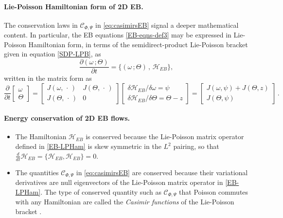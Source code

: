 \documentclass[11pt, oneside]{article}   	%
\numberwithin{equation}{section}
\theoremstyle{plain}
\theoremstyle{definition}
\theoremstyle{remark}
\newcommand{\<}{\langle}
\renewcommand{\>}{\rangle}
\newcommand{\mc}[1]{\mathcal{#1}}
\begin{document}
\paragraph{Lie-Poisson Hamiltonian form of 2D EB.}
The conservation laws in $\mc{C}_{\Phi,\Psi}$ in \eqref{eq:casimirsEB} signal a deeper mathematical content. In particular, the EB equations \eqref{EB-eqns-def3} may be expressed in Lie-Poisson Hamiltonian form, in terms of the semidirect-product Lie-Poisson bracket given in equation \eqref{SDP-LPB}, as
\begin{equation}
 \frac{\partial (\omega \,; \Theta)}{\partial t}  = \big\{(\omega \,;  \Theta)\,,\, \mc{H}_{EB}\big\},
\label{short-note}
\end{equation}
written in the matrix form as
\begin{equation}
 \frac{\partial }{\partial t} 
\begin{bmatrix}
\omega \\ \Theta
\end{bmatrix}
=
\begin{bmatrix}
J(\omega,\,\cdot\,) & J(\Theta,\,\cdot\,) 
\\ 
J(\Theta,\,\cdot\,)  & 0
\end{bmatrix}
\begin{bmatrix}
{\delta \mc H_{EB}}/{\delta \omega} = \psi
\\ 
{\delta \mc H_{EB}}/{\delta \Theta} = \Theta - z
\end{bmatrix}
=
\begin{bmatrix}
J(\omega,\psi) + J(\Theta,z)  
\\
J(\Theta, \psi )
\end{bmatrix} 
\,.
\label{EB-LPHam}
\end{equation}
%

\paragraph{Energy conservation of 2D EB flows.}
\begin{itemize}
\item
The Hamiltonian $\mc{H}_{EB}$ is conserved because the Lie-Poisson matrix operator defined in \eqref{EB-LPHam} is skew symmetric in the $L^2$ pairing, so that $\frac{d}{dt}\mc{H}_{EB} = \{\mc{H}_{EB},\mc{H}_{EB}\}=0$. 
\item
The quantities $\mc{C}_{\Phi,\Psi}$ in \eqref{eq:casimirsEB} are conserved because their variational derivatives are null eigenvectors of the Lie-Poisson matrix operator in \eqref{EB-LPHam}. The type of conserved quantity such as  $\mc{C}_{\Phi,\Psi}$ that Poisson commutes with any Hamiltonian are called the \emph{Casimir functions} of the Lie-Poisson bracket \cite{HMR1998}.
\end{itemize}  
\end{document}
